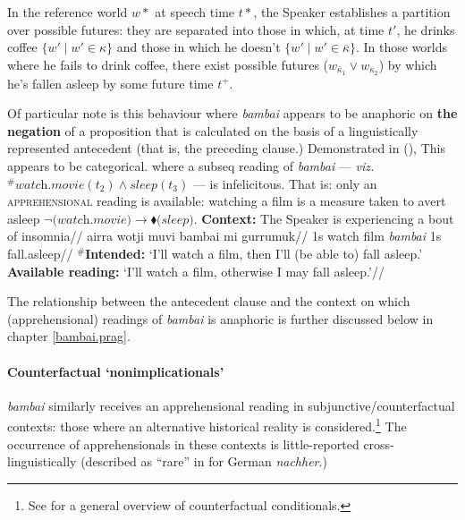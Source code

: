 In the reference world $w*$ at speech time $t*$, the Speaker establishes a partition over possible futures: they are separated into those in which, at time $ t' $, he drinks coffee $ \{w'\mid w'\in\kappa \} $ and those in which he doesn't $ \{w'\mid w'\in\overline\kappa \} $. In those worlds where he fails to drink coffee, there exist possible futures ($w_{\bar\kappa_1}\vee w_{\bar\kappa_2}$) by which he's fallen asleep by some future time $t^+$.
\xe

Of particular note is this behaviour where \textit{bambai} appears to be anaphoric on \textbf{the negation} of a proposition that is calculated on the basis of a linguistically represented antecedent (that is, the preceding clause.) Demonstrated in (), This appears to be categorical. where a {\sc subseq} reading of \textit{bambai} --- \textit{viz.} $^\# \textit{watch.movie}(t_2) \wedge \textit{sleep}(t_3) $ --- is infelicitous. That is: only an \textsc{apprehensional} reading is available: watching a film is a measure taken to avert asleep $ \boldsymbol\neg\textit{(watch.movie)}\to\blacklozenge \textit{(sleep)} $.
\pex
\begingl\glpreamble\textbf{Context:} The Speaker is experiencing a bout of insomnia//
\gla\ljudge{$^\#$}airra wotji muvi bambai mi gurrumuk//
\glb 1s watch film \textit{bambai} 1s fall.asleep//
\glft $ ^\# $\textbf{Intended:} `I'll watch a film, then I'll (be able to) fall asleep.'\\
\textbf{Available reading:} `I'll watch a film, otherwise I may fall asleep.'\trailingcitation{[AJ~23022017]}//
\endgl\xe

The relationship between the antecedent clause and the context on which (apprehensional) readings of \textit{bambai} is anaphoric is further discussed below in chapter \ref{bambai.prag}.
\paragraph{Counterfactual `nonimplicationals'}

\textit{bambai} similarly receives an apprehensional reading in subjunctive/counterfactual contexts: those where an alternative historical reality is considered.\footnote{See \citealp{VonFintel2012} for a general overview of counterfactual conditionals.} The occurrence of apprehensionals in these contexts is little-reported cross-linguistically (described as ``rare'' in \citealp{Angelo2018} for German \textit{nachher}.)



